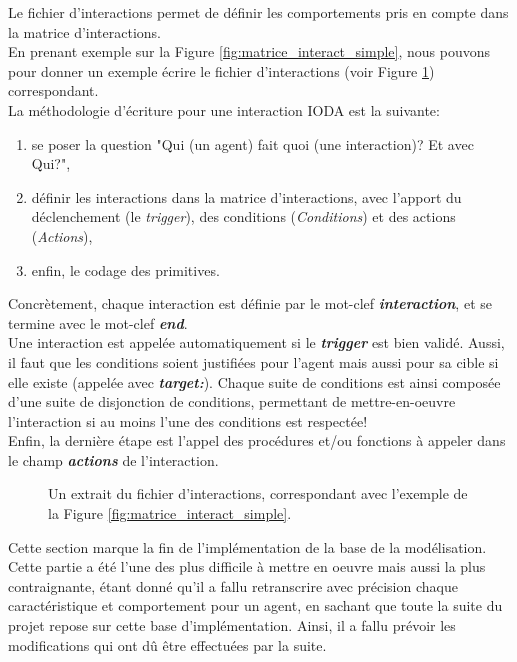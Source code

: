 Le fichier d'interactions permet de définir les comportements pris en compte dans la matrice d'interactions.
\\
En prenant exemple sur la Figure \ref{fig:matrice_interact_simple}, nous pouvons pour donner un exemple écrire le fichier d'interactions (voir Figure \ref{fig:fichier_interact_simple}) correspondant.
\\
La méthodologie d'écriture pour une interaction IODA est la suivante:
\begin{enumerate}
\item{se poser la question "Qui (un agent) fait quoi (une interaction)? Et avec Qui?",}
\item{définir les interactions dans la matrice d'interactions, avec l'apport du déclenchement (le \textit{trigger}), des conditions (\textit{Conditions}) et des actions (\textit{Actions}),}
\item{enfin, le codage des primitives.}
\end{enumerate}
Concrètement, chaque interaction est définie par le mot-clef \textit{\textbf{interaction}}, et se termine avec le mot-clef \textit{\textbf{end}}.
\\
Une interaction est appelée automatiquement si le \textit{\textbf{trigger}} est bien validé. Aussi, il faut que les conditions soient justifiées pour l'agent mais aussi pour sa cible si elle existe (appelée avec \textit{\textbf{target:}}). Chaque suite de conditions est ainsi composée d'une suite de disjonction de conditions, permettant de mettre-en-oeuvre l'interaction si au moins l'une des conditions est respectée!
\\
Enfin, la dernière étape est l'appel des procédures et/ou fonctions à appeler dans le champ \textit{\textbf{actions}} de l'interaction.

\begin{figure}[htbp]
	\makebox[\textwidth]{\hrulefill}{
	\small
	
	\normalsize}
	\caption{Un extrait du fichier d'interactions, correspondant avec l'exemple de la Figure \ref{fig:matrice_interact_simple}.}
	\label{fig:fichier_interact_simple}
\end{figure}

Cette section marque la fin de l'implémentation de la base de la modélisation.\\
Cette partie a été l'une des plus difficile à mettre en oeuvre mais aussi la plus contraignante, étant donné qu'il a fallu retranscrire avec précision chaque caractéristique et comportement pour un agent, en sachant que toute la suite du projet repose sur cette base d'implémentation. Ainsi, il a fallu prévoir les modifications qui ont dû être effectuées par la suite.

